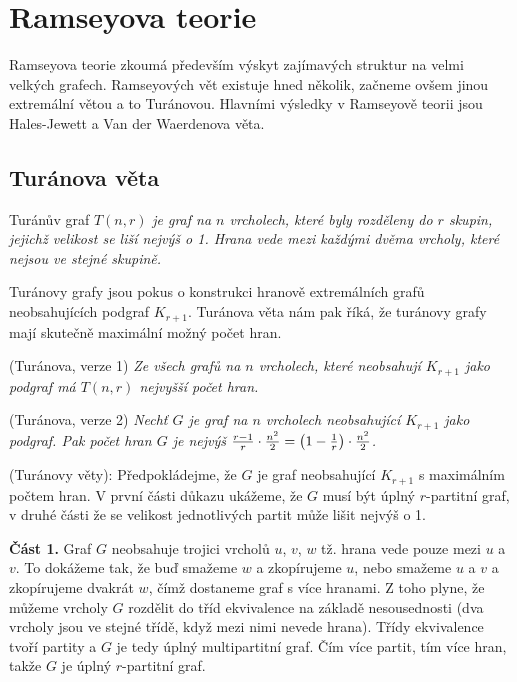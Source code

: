 \section{Ramseyova teorie}
Ramseyova teorie zkoumá především výskyt zajímavých struktur na velmi velkých grafech. Ramseyových vět existuje hned několik, začneme ovšem jinou extremální větou a to Turánovou. Hlavními výsledky v Ramseyově teorii jsou Hales-Jewett a Van der Waerdenova věta.

\subsection{Turánova věta}

\df Turánův graf $T(n,r)$ {\it je graf na $n$ vrcholech, které byly rozděleny do $r$ skupin, jejichž velikost se liší nejvýš o 1. Hrana vede mezi každými dvěma vrcholy, které nejsou ve stejné skupině.}

Turánovy grafy jsou pokus o konstrukci hranově extremálních grafů neobsahujících podgraf $K_{r+1}$. Turánova věta nám pak říká, že turánovy grafy mají skutečně maximální možný počet hran.

\vt (Turánova, verze 1) {\it Ze všech grafů na $n$ vrcholech, které neobsahují $K_{r+1}$ jako podgraf má $T(n,r)$ nejvyšší počet hran.}

\vt (Turánova, verze 2) {\it Nechť $G$ je graf na $n$ vrcholech neobsahující $K_{r+1}$ jako podgraf. Pak počet hran $G$ je nejvýš ${r-1\over r}\cdot{n^2\over 2} = \left(1-{1\over r}\right)\cdot{n^2\over 2}$.}

\dk (Turánovy věty): Předpokládejme, že $G$ je graf neobsahující $K_{r+1}$ s
maximálním počtem hran. V první části důkazu ukážeme, že $G$ musí být úplný
$r$-partitní graf, v druhé části že se velikost jednotlivých partit může lišit
nejvýš o 1.

\textbf{Část 1.} Graf $G$ neobsahuje trojici vrcholů $u$, $v$, $w$ tž. hrana
vede pouze mezi $u$ a $v$. To dokážeme tak, že buď smažeme $w$ a zkopírujeme
$u$, nebo smažeme $u$ a $v$ a zkopírujeme dvakrát $w$, čímž dostaneme graf s
více hranami. Z toho plyne, že můžeme vrcholy $G$ rozdělit do tříd ekvivalence
na základě nesousednosti (dva vrcholy jsou ve stejné třídě, když mezi nimi
nevede hrana). Třídy ekvivalence tvoří partity a $G$ je tedy úplný
multipartitní graf. Čím více partit, tím více hran, takže $G$ je úplný
$r$-partitní graf.

